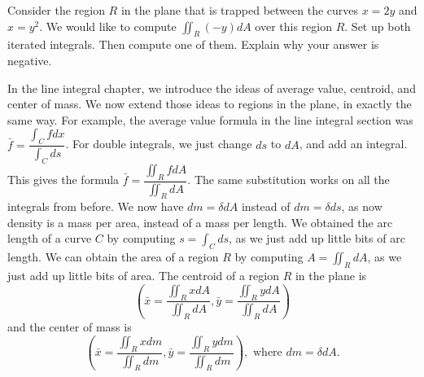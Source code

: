 %

\begin{problem}
Consider the region $R$ in the plane that is trapped between the curves $x=2y$ and $x=y^2$.  We would like to compute $\iint_R (-y) dA$ over this region $R$.  Set up both iterated integrals. Then compute one of them. Explain why your answer is negative.
\end{problem}



In the line integral chapter, we introduce the ideas of average value, centroid, and center of mass.  
We now extend those ideas to regions in the plane, in exactly the same way.  
For example, the average value formula in the line integral section was $\bar f = \dfrac{\int_C fdx}{\int_C ds}$. 
For double integrals, we just change $ds$ to $dA$, and add an integral.  
This gives the formula $\bar f = \dfrac{\iint_R fdA}{\iint_R dA}.$ 
The same substitution works on all the integrals from before.
We now have $dm = \delta dA$ instead of $dm=\delta ds$, as now density is a mass per area, instead of a mass per length. 
We obtained the arc length of a curve $C$ by computing $s=\int_C ds$, as we just add up little bits of arc length.  
We can obtain the area of a region $R$ by computing $A=\iint_R dA$, as we just add up little bits of area.
The centroid of a region $R$ in the plane is
$$
\left(\bar x = \frac{\iint_R x dA}{\iint_R dA}, 
\bar y = \frac{\iint_R y dA}{\iint_R dA}\right)
$$
and the center of mass is 
$$
\left(\bar x = \frac{\iint_R x  dm}{\iint_R dm}, 
\bar y = \frac{\iint_R y dm}{\iint_R dm}\right), \text{ where $dm=\delta dA$}.
$$





